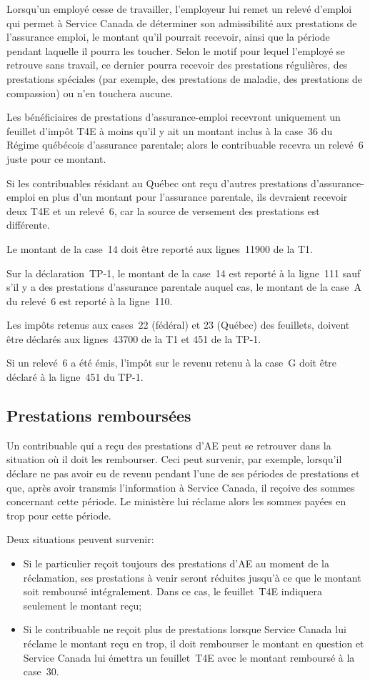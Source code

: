 Lorsqu'un employé cesse de travailler, l'employeur lui remet un relevé d'emploi qui permet à Service Canada de déterminer son admissibilité aux prestations de l'assurance emploi, le montant qu'il pourrait recevoir, ainsi que la période pendant laquelle il pourra les toucher. Selon le motif pour lequel l'employé se retrouve sans travail, ce dernier pourra recevoir des prestations régulières, des prestations spéciales (par exemple, des prestations de maladie, des prestations de compassion) ou n'en touchera aucune.

Les bénéficiaires de prestations d'assurance-emploi recevront uniquement un feuillet d'impôt T4E à moins qu'il y ait un montant inclus à la case~36 du Régime québécois d'assurance parentale; alors le contribuable recevra un relevé~6 juste pour ce montant.

\begin{note}
	Si les contribuables résidant au Québec ont reçu d'autres prestations d'assurance-emploi en plus d'un montant pour l'assurance parentale, ils devraient recevoir deux T4E et un relevé~6, car la source de versement des prestations est différente.
\end{note}

Le montant de la case~14 doit être reporté aux lignes~11900 de la T1.

Sur la déclaration~TP-1, le montant de la case~14 est reporté à la ligne~111 sauf s'il y a des prestations d'assurance parentale auquel cas, le montant de la case~A du relevé~6 est reporté à la ligne~110.

Les impôts retenus aux cases~22 (fédéral) et 23 (Québec) des feuillets, doivent être déclarés aux lignes~43700 de la T1 et 451 de la TP-1.

Si un relevé~6 a été émis, l'impôt sur le revenu retenu à la case~G doit être déclaré à la ligne~451 du TP-1.


\subsection{Prestations remboursées}
Un contribuable qui a reçu des prestations d'AE peut se retrouver dans la situation où il doit les rembourser. Ceci peut survenir, par exemple, lorsqu'il déclare ne pas avoir eu de revenu pendant l'une de ses périodes de prestations et que, après avoir transmis l'information à Service Canada, il reçoive des sommes concernant cette période. Le ministère lui réclame alors les sommes payées en trop pour cette période.

Deux situations peuvent survenir:
\begin{itemize}
	\item Si le particulier reçoit toujours des prestations d'AE au moment de la réclamation, ses prestations à venir seront réduites jusqu'à ce que le montant soit remboursé intégralement. Dans ce cas, le feuillet~T4E indiquera seulement le montant reçu;
	\item Si le contribuable ne reçoit plus de prestations lorsque Service Canada lui réclame le montant reçu en trop, il doit rembourser le montant en question et Service Canada lui émettra un feuillet~T4E avec le montant remboursé à la case~30.
\end{itemize}

